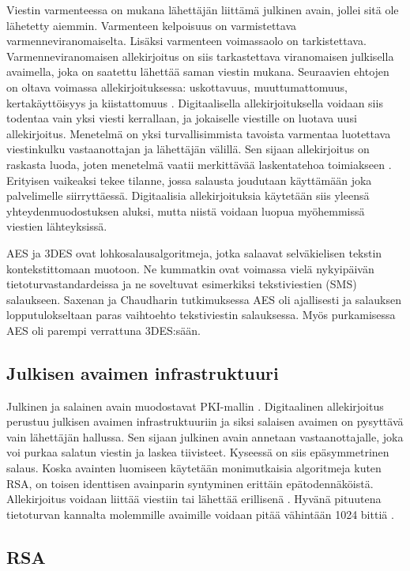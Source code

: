 \documentclass[finnish]{tktltiki2}
\theoremstyle{definition}
\theoremstyle{remark}
\begin{document}
Viestin varmenteessa on mukana lähettäjän liittämä julkinen avain, jollei sitä ole lähetetty aiemmin. Varmenteen kelpoisuus on varmistettava varmenneviranomaiselta. Lisäksi varmenteen voimassaolo on tarkistettava. Varmenneviranomaisen allekirjoitus on siis tarkastettava viranomaisen julkisella avaimella, joka on saatettu lähettää saman viestin mukana. Seuraavien ehtojen on oltava voimassa allekirjoituksessa: uskottavuus, muuttumattomuus, kertakäyttöisyys ja kiistattomuus \cite{e-c}. Digitaalisella allekirjoituksella voidaan siis todentaa vain yksi viesti kerrallaan, ja jokaiselle viestille on luotava uusi allekirjoitus. Menetelmä on yksi turvallisimmista tavoista varmentaa luotettava viestinkulku vastaanottajan ja lähettäjän välillä. Sen sijaan allekirjoitus on raskasta luoda, joten menetelmä vaatii merkittävää laskentatehoa toimiakseen \cite{proxy}. Erityisen vaikeaksi tekee tilanne, jossa salausta joudutaan käyttämään joka palvelimelle siirryttäessä. Digitaalisia allekirjoituksia käytetään siis yleensä yhteydenmuodostuksen aluksi, mutta niistä voidaan luopua myöhemmissä viestien lähteyksissä.

AES ja 3DES ovat lohkosalausalgoritmeja, jotka salaavat selväkielisen tekstin 
kontekstittomaan muotoon. Ne kummatkin ovat voimassa vielä nykyipäivän tietoturvastandardeissa ja ne soveltuvat esimerkiksi tekstiviestien (SMS) salaukseen. Saxenan ja Chaudharin tutkimuksessa AES oli ajallisesti ja salauksen lopputulokseltaan paras vaihtoehto tekstiviestin salauksessa. Myös purkamisessa AES oli parempi verrattuna 3DES:sään. \cite{gsm}


\subsection{Julkisen avaimen infrastruktuuri}

Julkinen ja salainen avain muodostavat PKI-mallin \cite{ECC}. Digitaalinen allekirjoitus perustuu julkisen avaimen infrastruktuuriin ja siksi salaisen avaimen on pysyttävä vain lähettäjän hallussa. Sen sijaan julkinen avain annetaan vastaanottajalle, joka voi purkaa salatun viestin ja laskea tiivisteet. Kyseessä on siis epäsymmetrinen salaus. Koska avainten luomiseen käytetään monimutkaisia algoritmeja kuten RSA, on toisen identtisen avainparin syntyminen erittäin epätodennäköistä. Allekirjoitus voidaan liittää viestiin tai lähettää erillisenä \cite{moen}. Hyvänä pituutena tietoturvan kannalta molemmille avaimille voidaan pitää vähintään 1024 bittiä \cite{ECC}. 

\subsection{RSA}
\end{document}
